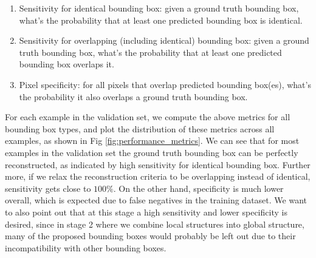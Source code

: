 \documentclass[12pt]{article}
\begin{document}
\begin{enumerate}
    \item Sensitivity for identical bounding box:
    given a ground truth bounding box, what's the probability that at least one predicted bounding box is identical.
    \item Sensitivity for overlapping (including identical) bounding box:
    given a ground truth bounding box, what's the probability that at least one predicted bounding box overlaps it.

    \item Pixel specificity:
    for all pixels that overlap predicted bounding box(es), what's the probability it also overlaps a ground truth bounding box.
\end{enumerate}


For each example in the validation set, we compute the above metrics for all bounding box types,
and plot the distribution of these metrics across all examples, as shown in Fig \ref{fig:performance_metrics}.
We can see that for most examples in the validation set the ground truth bounding box can be perfectly reconstructed,
as indicated by high sensitivity for identical bounding box.
Further more, if we relax the reconstruction criteria to be overlapping instead of identical,
sensitivity gets close to $100\%$.
On the other hand, specificity is much lower overall,
which is expected due to false negatives in the training dataset.
We want to also point out that at this stage a high sensitivity and lower specificity is desired,
since in stage 2 where we combine local structures into global structure, many of the proposed bounding boxes
would probably be left out due to their incompatibility with other bounding boxes.
\end{document}
